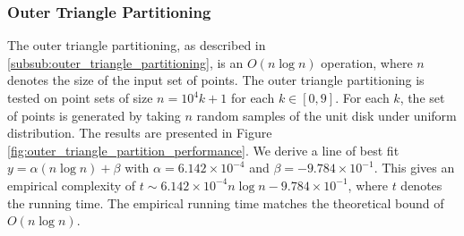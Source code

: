 \documentclass{article}
\newcommand{\figref}[1]{Figure \ref{#1}}
\begin{document}
\subsubsection{Outer Triangle Partitioning}

The outer triangle partitioning, as described in \ref{subsub:outer_triangle_partitioning}, is an $O(n \log n)$ operation, where $n$ denotes the size of the input set of points. The outer triangle partitioning is tested on point sets of size $n = 10^4 k + 1$ for each $k \in [0, 9]$. For each $k$, the set of points is generated by taking $n$ random samples of the unit disk under uniform distribution. The results are presented in \figref{fig:outer_triangle_partition_performance}. We derive a line of best fit $y = \alpha(n \log n) + \beta$ with $\alpha = 6.142 \times 10^{-4}$ and $\beta = -9.784 \times 10^{-1}$. This gives an empirical complexity of $t \sim 6.142 \times 10^{-4} n \log n -9.784 \times 10^{-1}$, where $t$ denotes the running time. The empirical running time matches the theoretical bound of $O(n \log n)$.

\begin{figure}[h!]
    \begin{floatrow}
    \end{floatrow}
\end{figure}
\end{document}

